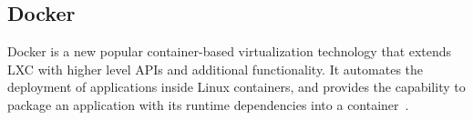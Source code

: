 


\subsection{Docker}

Docker is a new popular container-based virtualization technology that extends LXC
with higher level APIs and additional functionality. It automates the deployment of
applications inside Linux containers, and provides the capability to package an
application with its runtime dependencies into a container~\cite{slacker}.


